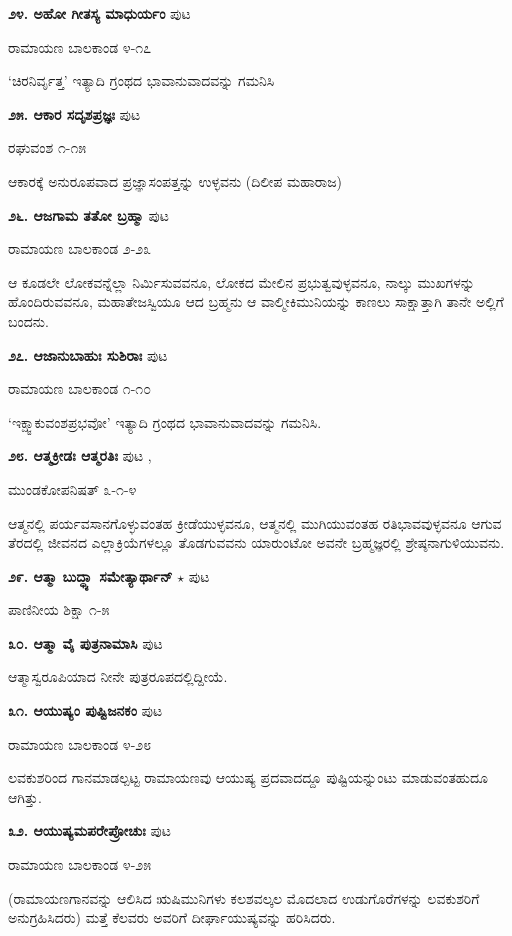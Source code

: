 \medskip
\noindent\textbf{೨೪. ಅಹೋ ಗೀತಸ್ಯ ಮಾಧುರ್ಯಂ} \hfill ಪುಟ \pageref{159}

\hfill ರಾಮಾಯಣ ಬಾಲಕಾಂಡ ೪-೧೭

`ಚಿರನಿರ್ವೃತ್ತ' ಇತ್ಯಾದಿ ಗ್ರಂಥದ ಭಾವಾನುವಾದವನ್ನು ಗಮನಿಸಿ

\medskip
\noindent\textbf{೨೫. ಆಕಾರ ಸದೃಶಪ್ರಜ್ಞಃ} \hfill ಪುಟ \pageref{139}

\hfill ರಘುವಂಶ ೧-೧೫

ಆಕಾರಕ್ಕೆ ಅನುರೂಪವಾದ ಪ್ರಜ್ಞಾಸಂಪತ್ತನ್ನು ಉಳ್ಳವನು (ದಿಲೀಪ ಮಹಾರಾಜ)

\medskip
\noindent\textbf{೨೬. ಆಜಗಾಮ ತತೋ ಬ್ರಹ್ಮಾ} \hfill ಪುಟ \pageref{202}

\hfill ರಾಮಾಯಣ ಬಾಲಕಾಂಡ ೨-೨೩

ಆ ಕೂಡಲೇ ಲೋಕವನ್ನೆಲ್ಲಾ ನಿರ್ಮಿಸುವವನೂ, ಲೋಕದ ಮೇಲಿನ ಪ್ರಭುತ್ವವುಳ್ಳವನೂ, ನಾಲ್ಕು ಮುಖಗಳನ್ನು ಹೊಂದಿರುವವನೂ, ಮಹಾತೇಜಸ್ವಿಯೂ ಆದ ಬ್ರಹ್ಮನು ಆ ವಾಲ್ಮೀಕಿಮುನಿಯನ್ನು ಕಾಣಲು ಸಾಕ್ಷಾತ್ತಾಗಿ ತಾನೇ ಅಲ್ಲಿಗೆ ಬಂದನು.

\medskip
\noindent\textbf{೨೭. ಆಜಾನುಬಾಹುಃ ಸುಶಿರಾಃ} \hfill ಪುಟ \pageref{247}

\hfill ರಾಮಾಯಣ ಬಾಲಕಾಂಡ ೧-೧೦

`ಇಕ್ಷ್ವಾಕುವಂಶಪ್ರಭವೋ' ಇತ್ಯಾದಿ ಗ್ರಂಥದ ಭಾವಾನುವಾದವನ್ನು ಗಮನಿಸಿ.

\medskip
\noindent\textbf{೨೮. ಆತ್ಮಕ್ರೀಡಃ ಆತ್ಮರತಿಃ} \hfill ಪುಟ \pageref{118},\pageref{143}

\hfill ಮುಂಡಕೋಪನಿಷತ್ ೩-೧-೪

ಆತ್ಮನಲ್ಲಿ ಪರ್ಯವಸಾನಗೊಳ್ಳುವಂತಹ ಕ್ರೀಡೆಯುಳ್ಳವನೂ, ಆತ್ಮನಲ್ಲಿ ಮುಗಿಯುವಂತಹ ರತಿಭಾವವುಳ್ಳವನೂ ಆಗುವ ತೆರದಲ್ಲಿ ಜೀವನದ ಎಲ್ಲಾಕ್ರಿಯೆಗಳಲ್ಲೂ ತೊಡಗುವವನು ಯಾರುಂಟೋ ಅವನೇ ಬ್ರಹ್ಮಜ್ಞರಲ್ಲಿ ಶ್ರೇಷ್ಠನಾಗುಳಿಯುವನು.

\medskip
\noindent\textbf{೨೯. ಆತ್ಮಾ ಬುದ್ಧ್ಯಾ ಸಮೇತ್ಯಾರ್ಥಾನ್} $\star$ \hfill ಪುಟ \pageref{18}

\hfill ಪಾಣಿನೀಯ ಶಿಕ್ಷಾ ೧-೫

\medskip
\noindent\textbf{೩೦. ಆತ್ಮಾ ವೈ ಪುತ್ರನಾಮಾಸಿ} \hfill ಪುಟ \pageref{228}

ಆತ್ಮಾಸ್ವರೂಪಿಯಾದ ನೀನೇ ಪುತ್ರರೂಪದಲ್ಲಿದ್ದೀಯೆ.

\medskip
\noindent\textbf{೩೧. ಆಯುಷ್ಯಂ ಪುಷ್ಟಿಜನಕಂ} \hfill ಪುಟ \pageref{210}

\hfill ರಾಮಾಯಣ ಬಾಲಕಾಂಡ ೪-೨೮

ಲವಕುಶರಿಂದ ಗಾನಮಾಡಲ್ಪಟ್ಟ ರಾಮಾಯಣವು ಆಯುಷ್ಯ ಪ್ರದವಾದದ್ದೂ ಪುಷ್ಟಿಯನ್ನುಂಟು ಮಾಡುವಂತಹುದೂ ಆಗಿತ್ತು.

\medskip
\noindent\textbf{೩೨. ಆಯುಷ್ಯಮಪರೇಪ್ರೋಚುಃ} \hfill ಪುಟ \pageref{168}

\hfill ರಾಮಾಯಣ ಬಾಲಕಾಂಡ ೪-೨೫

(ರಾಮಾಯಣಗಾನವನ್ನು ಆಲಿಸಿದ ಋಷಿಮುನಿಗಳು ಕಲಶವಲ್ಕಲ ಮೊದಲಾದ ಉಡುಗೊರೆಗಳನ್ನು ಲವಕುಶರಿಗೆ ಅನುಗ್ರಹಿಸಿದರು) ಮತ್ತೆ ಕೆಲವರು ಅವರಿಗೆ ದೀರ್ಘಾಯುಷ್ಯವನ್ನು ಹರಿಸಿದರು.

